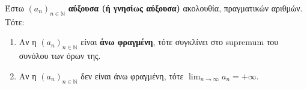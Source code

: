 \documentclass[a4paper,table]{report}
\begin{document}
\begin{mybox2}
  \begin{thm}
    \label{thm:aukssygk}
    Έστω $ {(a_{n})}_{n \in \mathbb{N}} $ \textbf{αύξουσα (ή γνησίως αύξουσα)} 
    ακολουθία, πραγματικών αριθμών. Τότε:
    \begin{enumerate}
      \item Αν η $ {(a_{n})}_{n \in \mathbb{N}} $ είναι \textbf{άνω φραγμένη}, 
        τότε συγκλίνει στο supremum του συνόλου των όρων της.
      \item Αν η $ {(a_{n})}_{n \in \mathbb{N}} $ δεν είναι άνω φραγμένη, τότε 
        $ \lim_{n \to \infty} a_{n}=+\infty $.
    \end{enumerate}
  \end{thm}
\end{mybox2}
\end{document}
